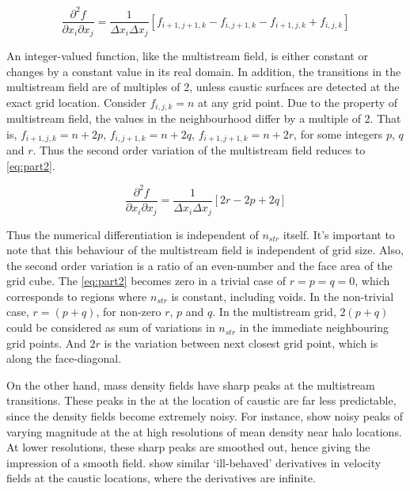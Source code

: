 \documentclass[fleqn,usenatbib,useAMS]{mnras}
\begin{document}
\begin{equation}
\label{eq:part1}
\frac{\partial^2 f}{\partial x_i \partial x_j} = \frac{1}{\Delta x_i \Delta x_j}  \left[f_{i+1,j+1,k}-f_{i,j+1,k}-f_{i+1,j,k}+f_{i,j,k} \right]
\end{equation}

An integer-valued function, like the multistream field, is either constant or changes by a constant value in its real domain. In addition, the transitions in the multistream field are of multiples of 2, unless caustic surfaces are detected at the exact grid location. Consider $f_{i,j,k} = n$ at any grid point. Due to the property of multistream field, the values in the neighbourhood differ by a multiple of 2. That is,  $f_{i+1,j,k} = n+2p$, $f_{i,j+1,k} = n+2q$, $f_{i+1,j+1,k} = n+2r$, for some integers $p$, $q$ and $r$. Thus the second order variation of the multistream field reduces to \autoref{eq:part2}. 

\begin{equation}
\label{eq:part2}
\frac{\partial^2 f}{\partial x_i \partial x_j} = \frac{1}{\Delta x_i \Delta x_j}  \left[ 2r - 2p + 2q \right]
\end{equation}

Thus the numerical differentiation is independent of $n_{str}$ itself. It's important to note that this behaviour of the multistream field is independent of grid size. Also, the second order variation is a ratio of an even-number and the face area of the grid cube. The \autoref{eq:part2} becomes zero in a trivial case of $r = p = q = 0$, which corresponds to regions where $n_{str}$ is constant, including voids. In the non-trivial case, $r=(p+q)$, for non-zero $r$, $p$ and $q$. In the multistream grid, $2(p+q)$ could be considered as sum of variations in $n_{str}$ in the immediate neighbouring grid points. And $2r$ is the variation between next closest grid point, which is along the face-diagonal. 

On the other hand, mass density fields have sharp peaks at the multistream transitions. These peaks in the at the location of caustic are far less predictable, since the density fields become extremely noisy. For instance,\cite{Vogelsberger2011b} show noisy peaks of varying magnitude at the at high resolutions of mean density near halo locations. At lower resolutions, these sharp peaks are smoothed out, hence giving the impression of a smooth field. \cite{Hahn2015a} show similar `ill-behaved' derivatives in velocity fields at the caustic locations, where the derivatives are infinite.   

 
\label{lastpage}
\end{document}
